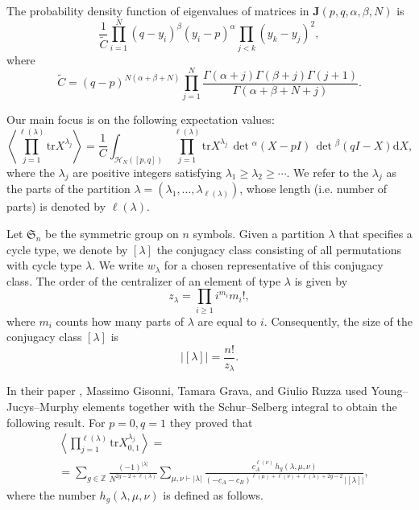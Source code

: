 \documentclass{article}
\newcommand{\tr}{\mathrm{tr}}
\newcommand{\dif}{\mathrm{d}}
\theoremstyle{plain}
\theoremstyle{definition}
\numberwithin{equation}{section}
\begin{document}
The probability density function of eigenvalues of matrices in $\mathbf{J}(p,q,\alpha,\beta, N)$ is 
\begin{equation}
    \frac{1}{\tilde{C}}\prod_{i=1}^N (q-y_i)^\beta (y_i - p)^\alpha \prod_{j<k} (y_k - y_j)^2,
\end{equation}
where 
\begin{equation}
    \tilde C =(q-p)^{N(\alpha+\beta+N)}\prod_{j=1}^{N}\frac{\Gamma(\alpha+j)\Gamma(\beta+j)\Gamma(j+1)}{\Gamma(\alpha+\beta+N+j)}.
\end{equation}

Our main focus is on the following expectation values:
\begin{equation}
    \label{eq:bracket}
    \left<\prod_{j=1}^{\ell(\lambda)} \tr X^{\lambda_{j}}\right> 
    = \frac{1}{C}\int_{\mathcal{H}_N([p,q])} \prod_{j=1}^{\ell(\lambda)} \tr X^{\lambda_{j}} \,\det{}^\alpha (X - pI)\, \det{}^\beta (q I - X) \dif X,
\end{equation}
where the $\lambda_j$ are positive integers satisfying $\lambda_1 \ge \lambda_2 \ge \cdots$. We refer to the $\lambda_j$ as the parts of the partition $\lambda = (\lambda_1, \ldots, \lambda_{\ell(\lambda)})$, whose length (i.e. number of parts) is denoted by $\ell(\lambda)$.

Let $\mathfrak{S}_n$ be the symmetric group on $n$ symbols. Given a partition $\lambda$ that specifies a cycle type, we denote by $[\lambda]$ the conjugacy class consisting of all permutations with cycle type $\lambda$. We write $w_\lambda$ for a chosen representative of this conjugacy class. The order of the centralizer of an element of type $\lambda$ is given by
\begin{equation}
    \label{centralizer}
    z_\lambda = \prod_{i\ge1} i^{m_i} m_i !,
\end{equation}
where $m_i$ counts how many parts of $\lambda$ are equal to $i$. Consequently, the size of the conjugacy class $[\lambda]$ is
\begin{equation}
    |[\lambda]| = \frac{n!}{z_\lambda}.
\end{equation}

In their paper \cite{gisonni2021jacobi}, Massimo Gisonni, Tamara Grava, and Giulio Ruzza used Young–Jucys–Murphy elements together with the Schur–Selberg integral to obtain the following result. For $p = 0, q = 1$ they proved that
\begin{equation}
    \label{GGR-correlators}
    \begin{aligned}
        & \left<\prod_{j=1}^{\ell(\lambda)}\tr X^{\lambda_{j}}_{0,1}\right> = \\
        & = \sum_{g\in \mathbb{Z}}\frac{(-1)^{|\lambda|}}{N^{2g-2+\ell(\lambda)}}\sum_{\mu,\nu\vdash|\lambda|}\frac{c_{A}^{\ell(\nu)}\, h_{g}(\lambda,\mu,\nu)}{(-c_{A}-c_{B})^{\ell(\mu)+\ell(\nu)+\ell(\lambda)+2g-2}\, |[\lambda]|},
    \end{aligned}
\end{equation}
where the number $h_g(\lambda, \mu, \nu)$ is defined as follows.
\end{document}
